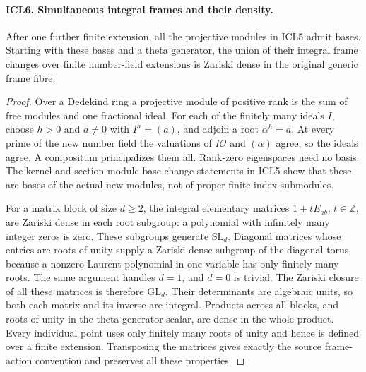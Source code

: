 \paragraph{ICL6. Simultaneous integral frames and their density.}
\label{claim:ICL6}
After one further finite extension, all the projective
modules in ICL5 admit bases.  Starting with these bases and a
theta generator, the union of their integral frame changes
over finite number-field extensions is Zariski dense in the
original generic frame fibre.
\begin{proof}
Over a Dedekind ring a projective module of positive rank is
the sum of free modules and one fractional ideal.  For each
of the finitely many ideals \(I\), choose \(h>0\) and \(a\ne0\)
with \(I^h=(a)\), and adjoin a root \(\alpha^h=a\).  At every
prime of the new number field the valuations of
\(I\mathcal O\) and \((\alpha)\) agree, so the ideals agree.
A compositum principalizes them all.  Rank-zero eigenspaces
need no basis.  The kernel and section-module base-change
statements in ICL5 show that these are bases of the actual
new modules, not of proper finite-index submodules.

For a matrix block of size \(d\geq2\), the integral
elementary matrices \(1+tE_{ab}\), \(t\in\mathbb Z\), are
Zariski dense in each root subgroup: a polynomial with
infinitely many integer zeros is zero.  These subgroups
generate \(\mathrm{SL}_d\).  Diagonal matrices whose entries
are roots of unity supply a Zariski dense subgroup of the
diagonal torus, because a nonzero Laurent polynomial in one
variable has only finitely many roots.  The same argument
handles \(d=1\), and \(d=0\) is trivial.  The Zariski closure
of all these matrices is therefore \(\mathrm{GL}_d\).
Their determinants are algebraic units, so both each matrix
and its inverse are integral.  Products across all blocks,
and roots of unity in the theta-generator scalar, are dense
in the whole product.  Every individual point uses only
finitely many roots of unity and hence is defined over a
finite extension.  Transposing the matrices gives exactly
the source frame-action convention and preserves all these
properties.
\end{proof}

